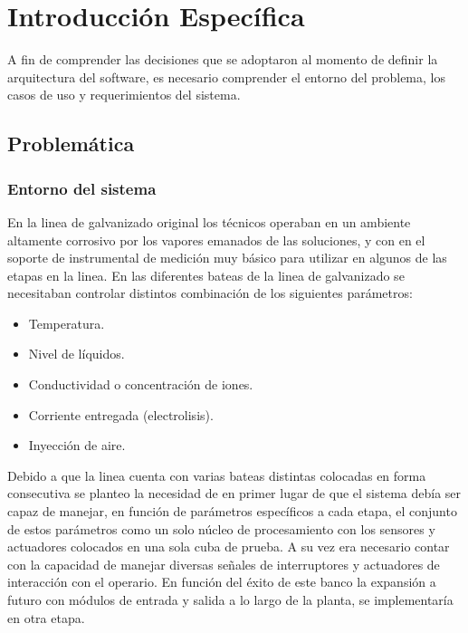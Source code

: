 \chapter{Introducción Específica} %
A fin de comprender las decisiones que se adoptaron al momento de definir la arquitectura del software, es necesario comprender el entorno del problema, los casos de uso y requerimientos del sistema. 

\section{Problemática}
\subsection{Entorno del sistema}

En la linea de galvanizado original los técnicos operaban en un ambiente altamente corrosivo por los vapores emanados de las soluciones, y con en el soporte de instrumental de medición muy básico para utilizar en algunos de las etapas en la linea.
En las diferentes bateas de la linea de galvanizado se necesitaban controlar distintos combinación de los siguientes parámetros:
\begin{itemize}
	\item Temperatura.
	\item Nivel de líquidos.
	\item Conductividad o concentración de iones.
	\item Corriente entregada (electrolisis).
	\item Inyección de aire.
\end{itemize}

Debido a que la linea cuenta con varias bateas distintas colocadas en forma consecutiva se planteo la necesidad de en primer lugar de que el sistema debía ser capaz de manejar, en función de parámetros específicos a cada etapa, el conjunto de estos parámetros como un solo núcleo de procesamiento con los sensores y actuadores colocados en una sola cuba de prueba. A su vez era necesario contar con la capacidad de manejar diversas señales de interruptores y actuadores de interacción con el operario.
En función del éxito de este banco la expansión a futuro con módulos de entrada y salida a lo largo de la planta, se implementaría en otra etapa.

